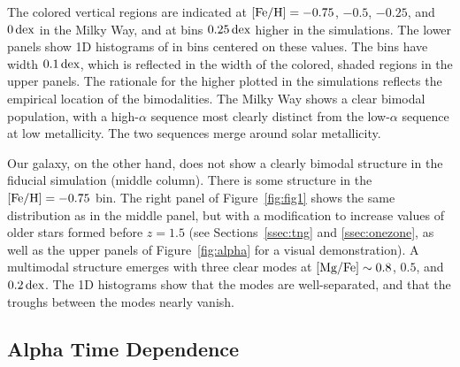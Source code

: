 The colored vertical regions are indicated at $[\textrm{Fe}/\textrm{H}]=-0.75$, $-0.5$, $-0.25$, and $0\,\textrm{dex}$ in the Milky Way, and at bins $0.25\,\textrm{dex}$ higher in the simulations. The lower panels show 1D histograms of \MgFe{} in bins centered on these values. The bins have width $0.1\,\textrm{dex}$, which is reflected in the width of the colored, shaded regions in the upper panels. The rationale for the higher plotted \FeH{} in the simulations reflects the empirical location of the bimodalities. The Milky Way shows a clear bimodal population, with a high-$\alpha$ sequence most clearly distinct from the low-$\alpha$ sequence at low metallicity. The two sequences merge around solar metallicity.

Our galaxy, on the other hand, does not show a clearly bimodal structure in the fiducial simulation (middle column). There is some structure in the $[\textrm{Fe}/\textrm{H}]=-0.75$ bin. The right panel of Figure~\ref{fig:fig1} shows the same distribution as in the middle panel, but with a modification to increase \MgFe{} values of older stars formed before $z=1.5$ (see Sections~\ref{ssec:tng} and \ref{ssec:onezone}, as well as the upper panels of Figure~\ref{fig:alpha} for a visual demonstration). A multimodal structure emerges with three clear modes at $[\textrm{Mg}/\textrm{Fe}]\sim0.8$, $0.5$, and $0.2\,\textrm{dex}$. The 1D histograms show that the modes are well-separated, and that the troughs between the modes nearly vanish.

\subsection{Alpha Time Dependence}\label{ssec:alpha_time}

